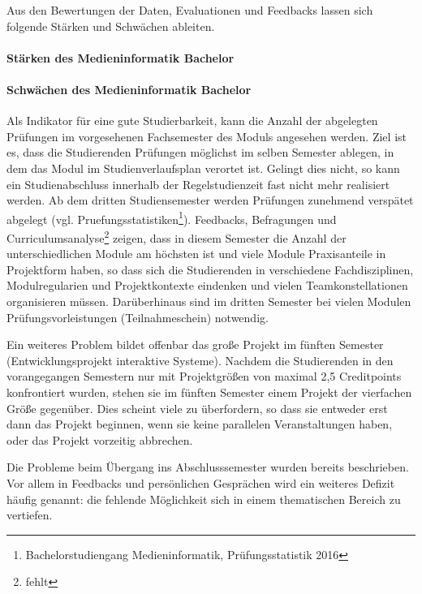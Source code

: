 Aus den Bewertungen der Daten, Evaluationen und Feedbacks lassen sich
folgende Stärken und Schwächen ableiten.

\paragraph{Stärken des Medieninformatik
Bachelor}\label{stuxe4rken-des-medieninformatik-bachelor}

\paragraph{Schwächen des Medieninformatik
Bachelor}\label{schwuxe4chen-des-medieninformatik-bachelor}

Als Indikator für eine gute Studierbarkeit, kann die Anzahl der
abgelegten Prüfungen im vorgesehenen Fachsemester des Moduls angesehen
werden. Ziel ist es, dass die Studierenden Prüfungen möglichst im selben
Semester ablegen, in dem das Modul im Studienverlaufsplan verortet ist.
Gelingt dies nicht, so kann ein Studienabschluss innerhalb der
Regelstudienzeit fast nicht mehr realisiert werden. Ab dem dritten
Studiensemester werden Prüfungen zunehmend verspätet abgelegt (vgl.
Pruefungsstatistiken\footnote{Bachelorstudiengang Medieninformatik,
  Prüfungsstatistik 2016}). Feedbacks, Befragungen und
Curriculumsanalyse\footnote{fehlt} zeigen, dass in diesem Semester die
Anzahl der unterschiedlichen Module am höchsten ist und viele Module
Praxisanteile in Projektform haben, so dass sich die Studierenden in
verschiedene Fachdisziplinen, Modulregularien und Projektkontexte
eindenken und vielen Teamkonstellationen organisieren müssen.
Darüberhinaus sind im dritten Semester bei vielen Modulen
Prüfungsvorleistungen (Teilnahmeschein) notwendig.

Ein weiteres Problem bildet offenbar das große Projekt im fünften
Semester (Entwicklungsprojekt interaktive Systeme). Nachdem die
Studierenden in den vorangegangen Semestern nur mit Projektgrößen von
maximal 2,5 Creditpoints konfrontiert wurden, stehen sie im fünften
Semester einem Projekt der vierfachen Größe gegenüber. Dies scheint
viele zu überfordern, so dass sie entweder erst dann das Projekt
beginnen, wenn sie keine parallelen Veranstaltungen haben, oder das
Projekt vorzeitig abbrechen.

Die Probleme beim Übergang ins Abschlusssemester wurden bereits
beschrieben. Vor allem in Feedbacks und persönlichen Gesprächen wird ein
weiteres Defizit häufig genannt: die fehlende Möglichkeit sich in einem
thematischen Bereich zu vertiefen.

